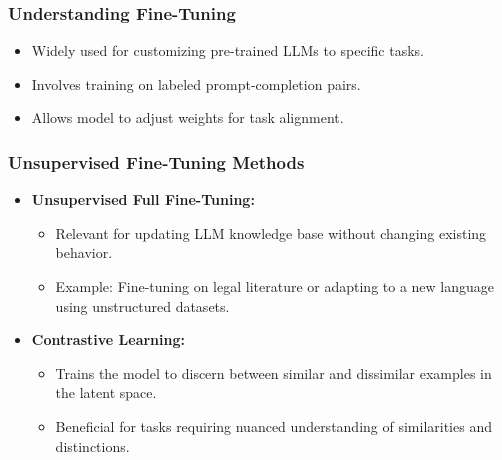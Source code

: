 \begin{frame}[fragile]\frametitle{Understanding Fine-Tuning}
    \begin{itemize}
        \item Widely used for customizing pre-trained LLMs to specific tasks.
        \item Involves training on labeled prompt-completion pairs.
        \item Allows model to adjust weights for task alignment.
    \end{itemize}
\end{frame}

\begin{frame}[fragile]\frametitle{Unsupervised Fine-Tuning Methods}

\begin{itemize}
\item \textbf{Unsupervised Full Fine-Tuning:}
  \begin{itemize}
	\item Relevant for updating LLM knowledge base without changing existing behavior.
	\item Example: Fine-tuning on legal literature or adapting to a new language using unstructured datasets.
  \end{itemize}
\item \textbf{Contrastive Learning:}
  \begin{itemize}
	\item Trains the model to discern between similar and dissimilar examples in the latent space.
	\item Beneficial for tasks requiring nuanced understanding of similarities and distinctions.
  \end{itemize}
\end{itemize}
\end{frame}

